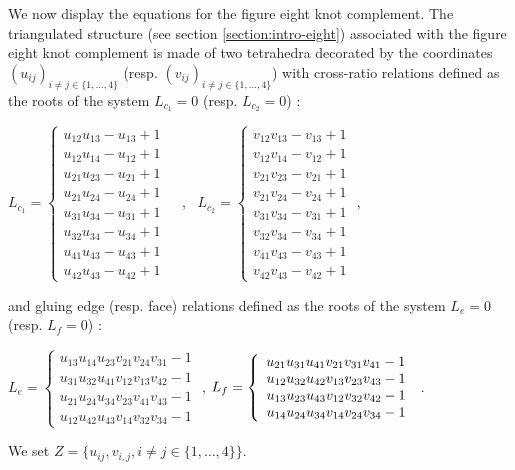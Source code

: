 We now display the equations for the figure eight knot complement. The triangulated structure (see section \ref{section:intro-eight}) associated
with the figure eight knot complement is made of two tetrahedra decorated by
the coordinates $(u_{ij} )_{i \neq j \in \{1, \ldots ,4\}}$ (resp. $(v_{ij}
)_{i \neq j \in \{1, \ldots ,4\}}$) with cross-ratio relations defined as the
roots of the system $L_{c_{1}} =0$ (resp. $L_{c_{2}} =0$) :
\begin{center}
  $L_{c_{1}} = \left\{ \begin{array}{c}
    u_{12} u_{13} -u_{13} +1\\
    u_{12} u_{14} -u_{12} +1\\
    u_{21} u_{23} -u_{21} +1\\
    u_{21} u_{24} -u_{24} +1\\
    u_{31} u_{34} -u_{31} +1\\
    u_{32} u_{34} -u_{34} +1\\
    u_{41} u_{43} -u_{43} +1\\
    u_{42} u_{43} -u_{42} +1
  \end{array} \right. \begin{array}{c}
    \\
    \\
    
  \end{array}$ , \ $L_{c_{2}} = \left\{ \begin{array}{c}
    v_{12} v_{13} -v_{13} +1\\
    v_{12} v_{14} -v_{12} +1\\
    v_{21} v_{23} -v_{21} +1\\
    v_{21} v_{24} -v_{24} +1\\
    v_{31} v_{34} -v_{31} +1\\
    v_{32} v_{34} -v_{34} +1\\
    v_{41} v_{43} -v_{43} +1\\
    v_{42} v_{43} -v_{42} +1
  \end{array} \right.$ ,
\end{center}
and gluing edge (resp. face) relations defined as the roots of the system
$L_{e} =0$ (resp. $L_{f} =0$) :
\begin{center}
  $L_{e} = \left\{ \begin{array}{c}
    u_{13} u_{14} u_{23} v_{21} v_{24} v_{31} -1\\
    u_{31} u_{32} u_{41} v_{12} v_{13} v_{42} -1\\
    u_{21} u_{24} u_{34} v_{23} v_{41} v_{43} -1\\
    u_{12} u_{42} u_{43} v_{14} v_{32} v_{34} -1
  \end{array} \right.$ , $L_{f} = \left\{ \begin{array}{c}
    u_{21} u_{31} u_{41} v_{21} v_{31} v_{41} -1_{\nosymbol}\\
    u_{12} u_{32} u_{42} v_{13} v_{23} v_{43} -1\\
    u_{13} u_{23} u_{43} v_{12} v_{32} v_{42} -1\\
    u_{14} u_{24} u_{34} v_{14} v_{24} v_{34} -1
  \end{array} \right.$ .
\end{center}
We set $Z= \{ u_{ij} ,v_{i,j} ,i \neq j \in \{ 1, \ldots ,4 \} \}$.


